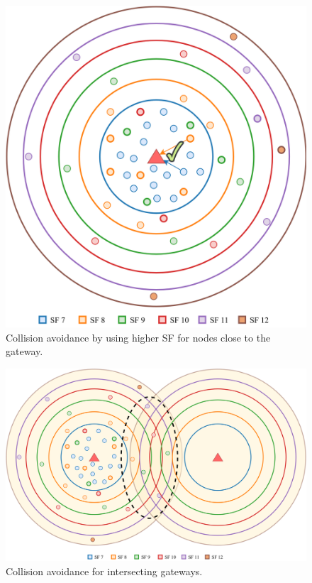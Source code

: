 \documentclass[conference]{IEEEtran}
\begin{document}
\begin{figure}
\centering
\includegraphics[width=\linewidth]{collision_solution_single_gw}
\caption{Collision avoidance by using higher SF for nodes close to the gateway.}
\label{fig:collision_solution_single_gw}
\end{figure}

\begin{figure}
\centering
\includegraphics[width=\linewidth]{collision_solution_multi_gw}
\caption{Collision avoidance for intersecting gateways.}
\label{fig:collision_solution_multi_gw}
\end{figure}
\end{document}
